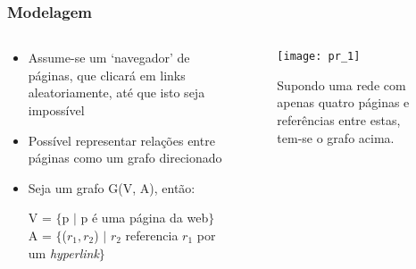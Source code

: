 \documentclass{beamer}
\begin{document}
\begin{frame}
    \frametitle{Modelagem}
    \begin{columns}[T]
        \begin{column}{.55\textwidth}
            \begin{itemize}
                \item Assume-se um `navegador' de páginas, que clicará em
                links aleatoriamente, até que isto seja impossível
                \item Possível representar relações entre páginas como um
                grafo direcionado
                \item Seja um grafo G(V, A), então:
                \begin{center}
                    V = $\{$p $\mid$ p é uma página da web$\}$ \\
                    A = $\{$($r_1, r_2$) $|$ $r_2$ referencia
                        $r_1$ por um \textit{hyperlink}$\}$
                \end{center}
            \end{itemize}
        \end{column}
        \begin{column}{.4\textwidth}
        \begin{figure}
            \texttt{[image: pr\_1]}
            \caption{\tiny{Supondo uma rede com apenas quatro páginas e
            referências entre estas, tem-se o grafo acima.}}
        \end{figure}
        \end{column}
    \end{columns}
\end{frame}
\end{document}
